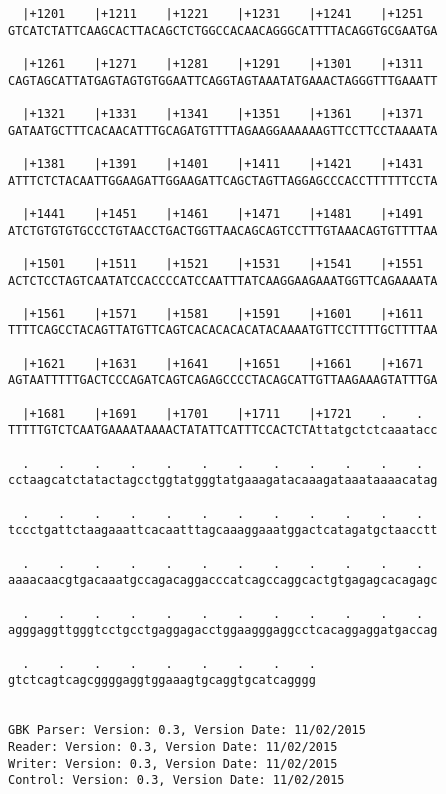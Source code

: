 \documentclass{article}
\begin{document}
\begin{Verbatim}
  |+1201    |+1211    |+1221    |+1231    |+1241    |+1251  
GTCATCTATTCAAGCACTTACAGCTCTGGCCACAACAGGGCATTTTACAGGTGCGAATGA
                                                            
  |+1261    |+1271    |+1281    |+1291    |+1301    |+1311  
CAGTAGCATTATGAGTAGTGTGGAATTCAGGTAGTAAATATGAAACTAGGGTTTGAAATT
                                                            
  |+1321    |+1331    |+1341    |+1351    |+1361    |+1371  
GATAATGCTTTCACAACATTTGCAGATGTTTTAGAAGGAAAAAAGTTCCTTCCTAAAATA
                                                            
  |+1381    |+1391    |+1401    |+1411    |+1421    |+1431  
ATTTCTCTACAATTGGAAGATTGGAAGATTCAGCTAGTTAGGAGCCCACCTTTTTTCCTA
                                                            
  |+1441    |+1451    |+1461    |+1471    |+1481    |+1491  
ATCTGTGTGTGCCCTGTAACCTGACTGGTTAACAGCAGTCCTTTGTAAACAGTGTTTTAA
                                                            
  |+1501    |+1511    |+1521    |+1531    |+1541    |+1551  
ACTCTCCTAGTCAATATCCACCCCATCCAATTTATCAAGGAAGAAATGGTTCAGAAAATA
                                                            
  |+1561    |+1571    |+1581    |+1591    |+1601    |+1611  
TTTTCAGCCTACAGTTATGTTCAGTCACACACACATACAAAATGTTCCTTTTGCTTTTAA
                                                            
  |+1621    |+1631    |+1641    |+1651    |+1661    |+1671  
AGTAATTTTTGACTCCCAGATCAGTCAGAGCCCCTACAGCATTGTTAAGAAAGTATTTGA
                                                            
  |+1681    |+1691    |+1701    |+1711    |+1721    .    .  
TTTTTGTCTCAATGAAAATAAAACTATATTCATTTCCACTCTAttatgctctcaaatacc
                                                            
  .    .    .    .    .    .    .    .    .    .    .    .  
cctaagcatctatactagcctggtatgggtatgaaagatacaaagataaataaaacatag
                                                            
  .    .    .    .    .    .    .    .    .    .    .    .  
tccctgattctaagaaattcacaatttagcaaaggaaatggactcatagatgctaacctt
                                                            
  .    .    .    .    .    .    .    .    .    .    .    .  
aaaacaacgtgacaaatgccagacaggacccatcagccaggcactgtgagagcacagagc
                                                            
  .    .    .    .    .    .    .    .    .    .    .    .  
agggaggttgggtcctgcctgaggagacctggaagggaggcctcacaggaggatgaccag
                                                            
  .    .    .    .    .    .    .    .    .
gtctcagtcagcggggaggtggaaagtgcaggtgcatcagggg
                                           
                                           
GBK Parser: Version: 0.3, Version Date: 11/02/2015
Reader: Version: 0.3, Version Date: 11/02/2015
Writer: Version: 0.3, Version Date: 11/02/2015
Control: Version: 0.3, Version Date: 11/02/2015
\end{Verbatim}
\end{document}
